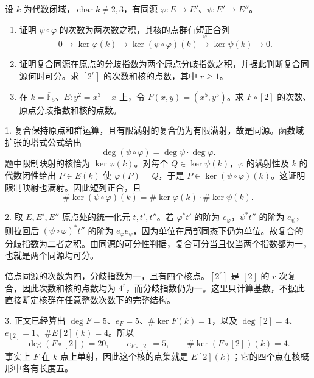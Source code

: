 \begin{exercise}\label{b3:ex:H-isogeny-composition}
	设 \(k\) 为代数闭域，\(\operatorname{char}k\ne2,3\)，有同源 \(\varphi:E\rightarrow E'\)、\(\psi:E'\rightarrow E''\)。
	\begin{enumerate}
		\item 证明 \(\psi\circ\varphi\) 的次数为两次数之积，其核的点群有短正合列
		\[
			0\longrightarrow\ker\varphi(k)
			\longrightarrow\ker(\psi\circ\varphi)(k)
			\xrightarrow{\ \varphi\ }\ker\psi(k)\longrightarrow0.
		\]
		\item 证明复合同源在原点的分歧指数为两个原点分歧指数之积，并据此判断复合同源何时可分。求 \([2^r]\) 的次数和核的点数，其中 \(r\ge1\)。
		\item 在 \(k=\overline{\mathbb F}_5\)、\(E:y^2=x^3-x\) 上，令 \(F(x,y)=(x^5,y^5)\)。求 \(F\circ[2]\) 的次数、原点分歧指数和核的点数。
	\end{enumerate}
\end{exercise}
\begin{solution}
	1. 复合保持原点和群运算，且有限满射的复合仍为有限满射，故是同源。函数域扩张的塔式公式给出
	\[
		\deg(\psi\circ\varphi)=\deg\psi\cdot\deg\varphi.
	\]
	题中限制映射的核恰为 \(\ker\varphi(k)\)。对每个 \(Q\in\ker\psi(k)\)，\(\varphi\) 的满射性及 \(k\) 的代数闭性给出 \(P\in E(k)\) 使 \(\varphi(P)=Q\)，于是 \(P\in\ker(\psi\circ\varphi)(k)\)。这证明限制映射也满射。因此短列正合，且
	\[
		\#\ker(\psi\circ\varphi)(k)
		=\#\ker\varphi(k)\cdot\#\ker\psi(k).
	\]

	2. 取 \(E,E',E''\) 原点处的统一化元 \(t,t',t''\)。若 \(\varphi^*t'\) 的阶为 \(e_\varphi\)，\(\psi^*t''\) 的阶为 \(e_\psi\)，则拉回后 \((\psi\circ\varphi)^*t''\) 的阶为 \(e_\varphi e_\psi\)，因为单位在局部同态下仍为单位。故复合的分歧指数为二者之积。由同源的可分性判据，复合可分当且仅当两个指数都为一，也就是两个同源均可分。

	倍点同源的次数为四，分歧指数为一，且有四个核点。\([2^r]\) 是 \([2]\) 的 \(r\) 次复合，因此次数和核的点数均为 \(4^r\)，而分歧指数仍为一。这里只计算基数，不据此直接断定核群在任意整数次数下的完整结构。

	3. 正文已经算出 \(\deg F=5\)、\(e_F=5\)、\(\#\ker F(k)=1\)，以及 \(\deg[2]=4\)、\(e_{[2]}=1\)、\(\#E[2](k)=4\)。所以
	\[
		\deg(F\circ[2])=20,\qquad
		e_{F\circ[2]}=5,\qquad
		\#\ker(F\circ[2])(k)=4.
	\]
	事实上 \(F\) 在 \(k\) 点上单射，因此这个核的点集就是 \(E[2](k)\)；它的四个点在核概形中各有长度五。
\end{solution}

